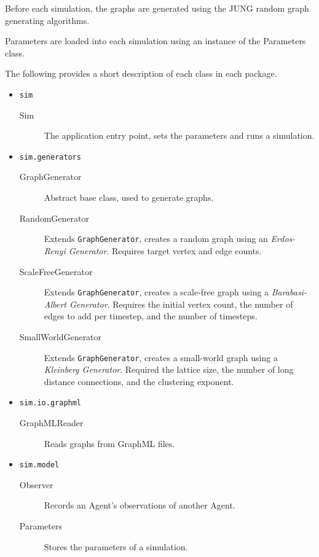 Before each simulation, the graphs are generated using the JUNG random graph generating algorithms.

Parameters are loaded into each simulation using an instance of the Parameters class.

The following provides a short description of each class in each
package.

\begin{itemize}
    \item {\tt sim}

    \begin{description}
        \item[Sim] The application entry point, sets the parameters and
        runs a simulation.
    \end{description}

    \item {\tt sim.generators}

    \begin{description}
        \item[GraphGenerator] Abstract base class, used to generate
        graphs.
        \item[RandomGenerator] Extends {\tt GraphGenerator}, creates a
        random graph using an {\it Erdos-Renyi Generator}. Requires
        target vertex and edge counts.
        \item[ScaleFreeGenerator] Extends {\tt GraphGenerator}, creates
        a scale-free graph using a {\it Barabasi-Albert Generator}.
        Requires the initial vertex count, the number of edges to add per
        timestep, and the number of timesteps.
        \item[SmallWorldGenerator] Extends {\tt GraphGenerator}, creates
        a small-world graph using a {\it Kleinberg Generator}.
        Required the lattice size, the number of long distance connections,
        and the clustering exponent.
    \end{description}

    \item {\tt sim.io.graphml}

    \begin{description}
        \item[GraphMLReader] Reads graphs from GraphML files.
    \end{description}

    \item {\tt sim.model}

    \begin{description}
        \item[Observer] Records an Agent's observations of another
        Agent.
        \item[Parameters] Stores the parameters of a simulation.
    \end{description}


\end{itemize}
